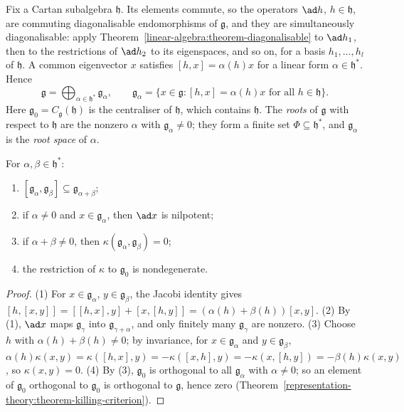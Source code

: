 Fix a Cartan subalgebra $\mathfrak{h}$. Its elements commute, so the operators $\ad h$, $h \in \mathfrak{h}$, are commuting diagonalisable endomorphisms of $\mathfrak{g}$, and they are
simultaneously diagonalisable: apply Theorem~\ref{linear-algebra:theorem-diagonalisable} to $\ad h_1$, then to the restrictions of $\ad h_2$ to its eigenspaces, and so on, for a
basis $h_1, \ldots, h_l$ of $\mathfrak{h}$. A common eigenvector $x$ satisfies $[h, x] = \alpha(h)x$ for a linear form $\alpha \in \mathfrak{h}^*$. Hence
\[
\mathfrak{g} = \bigoplus_{\alpha \in \mathfrak{h}^*}\mathfrak{g}_\alpha, \qquad \mathfrak{g}_\alpha = \{x \in \mathfrak{g} : [h, x] = \alpha(h)x \text{ for all } h \in \mathfrak{h}\}.
\]
Here $\mathfrak{g}_0 = C_{\mathfrak{g}}(\mathfrak{h})$ is the centraliser of $\mathfrak{h}$, which contains $\mathfrak{h}$. The \emph{roots} of $\mathfrak{g}$ with respect to $\mathfrak{h}$
are the nonzero $\alpha$ with $\mathfrak{g}_\alpha \neq 0$; they form a finite set $\Phi \subseteq \mathfrak{h}^*$, and $\mathfrak{g}_\alpha$ is the \emph{root space} of $\alpha$.

\begin{proposition}\label{representation-theory:proposition-root-spaces}
For $\alpha, \beta \in \mathfrak{h}^*$:
\begin{enumerate}
\item $[\mathfrak{g}_\alpha, \mathfrak{g}_\beta] \subseteq \mathfrak{g}_{\alpha + \beta}$;
\item if $\alpha \neq 0$ and $x \in \mathfrak{g}_\alpha$, then $\ad x$ is nilpotent;
\item if $\alpha + \beta \neq 0$, then $\kappa(\mathfrak{g}_\alpha, \mathfrak{g}_\beta) = 0$;
\item the restriction of $\kappa$ to $\mathfrak{g}_0$ is nondegenerate.
\end{enumerate}
\end{proposition}

\begin{proof}
(1) For $x \in \mathfrak{g}_\alpha$, $y \in \mathfrak{g}_\beta$, the Jacobi identity gives $[h, [x, y]] = [[h, x], y] + [x, [h, y]] = (\alpha(h) + \beta(h))[x, y]$. (2) By (1),
$\ad x$ maps $\mathfrak{g}_\gamma$ into $\mathfrak{g}_{\gamma + \alpha}$, and only finitely many $\mathfrak{g}_\gamma$ are nonzero. (3) Choose $h$ with $\alpha(h) + \beta(h) \neq 0$; by
invariance, for $x \in \mathfrak{g}_\alpha$ and $y \in \mathfrak{g}_\beta$, $\alpha(h)\kappa(x, y) = \kappa([h, x], y) = -\kappa([x, h], y) = -\kappa(x, [h, y]) = -\beta(h)\kappa(x, y)$,
so $\kappa(x, y) = 0$. (4) By (3), $\mathfrak{g}_0$ is orthogonal to all $\mathfrak{g}_\alpha$ with $\alpha \neq 0$; so an element of $\mathfrak{g}_0$ orthogonal to $\mathfrak{g}_0$ is
orthogonal to $\mathfrak{g}$, hence zero (Theorem~\ref{representation-theory:theorem-killing-criterion}).
\end{proof}

